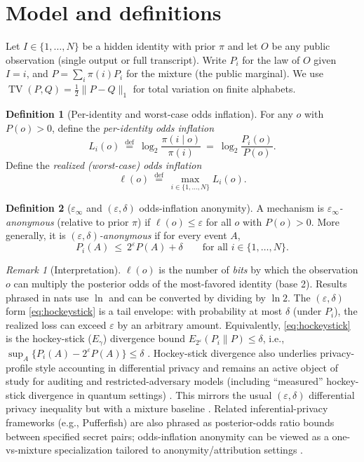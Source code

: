 \documentclass[11pt]{article}
\DeclareMathOperator{\TV}{TV}
\newcommand{\defeq}{\stackrel{\mathrm{def}}{=}}
\theoremstyle{definition}
\newtheorem{definition}{Definition}
\theoremstyle{remark}
\newtheorem{remark}{Remark}
\begin{document}
\section{Model and definitions}
Let $I\in\{1,\dots,N\}$ be a hidden identity with prior $\pi$ and let $O$ be any public observation (single output or full transcript).
Write $P_i$ for the law of $O$ given $I=i$, and $P=\sum_i \pi(i)P_i$ for the mixture (the public marginal).
We use $\TV(P,Q)=\tfrac12\|P-Q\|_1$ for total variation on finite alphabets.

\begin{definition}[Per-identity and worst-case odds inflation]\label{def:odds_inflation}
For any $o$ with $P(o)>0$, define the \emph{per-identity odds inflation}
\[
L_i(o)\ \defeq\ \log_2\frac{\pi(i\mid o)}{\pi(i)}\ =\ \log_2\frac{P_i(o)}{P(o)}.
\]
Define the \emph{realized (worst-case) odds inflation}
\[
\ell(o)\ \defeq\ \max_{i\in\{1,\dots,N\}} L_i(o).
\]
\end{definition}

\begin{definition}[$\varepsilon_\infty$ and $(\varepsilon,\delta)$ odds-inflation anonymity]\label{def:epsinf}
A mechanism is \emph{$\varepsilon_\infty$-anonymous} (relative to prior $\pi$) if $\ell(o)\le \varepsilon$ for all $o$ with $P(o)>0$.
More generally, it is \emph{$(\varepsilon,\delta)$-anonymous} if for every event $A$,
\begin{equation}\label{eq:hockeystick}
P_i(A)\ \le\ 2^\varepsilon P(A) + \delta
\qquad\text{for all } i\in\{1,\dots,N\}.
\end{equation}
\end{definition}

\begin{remark}[Interpretation]
$\ell(o)$ is the number of \emph{bits} by which the observation $o$ can multiply the posterior odds of the most-favored identity (base 2). Results phrased in nats use $\ln$ and can be converted by dividing by $\ln 2$.
The $(\varepsilon,\delta)$ form \eqref{eq:hockeystick} is a tail envelope: with probability at most $\delta$ (under $P_i$), the realized loss can exceed $\varepsilon$ by an arbitrary amount.
Equivalently, \eqref{eq:hockeystick} is the hockey-stick (\emph{$E_\gamma$}) divergence bound $E_{2^\varepsilon}(P_i\|P)\le\delta$, i.e., $\sup_A\{P_i(A)-2^\varepsilon P(A)\}\le\delta$ \cite{LiuCuffVerdu2017}.
Hockey-stick divergence also underlies privacy-profile style accounting in differential privacy and remains an active object of study for auditing and restricted-adversary models (including ``measured'' hockey-stick divergence in quantum settings) \cite{NuradhaMeasuredHockeyStick2025}.
This mirrors the usual $(\varepsilon,\delta)$ differential privacy inequality but with a mixture baseline \cite{DworkRoth2014}.
Related inferential-privacy frameworks (e.g., Pufferfish) are also phrased as posterior-odds ratio bounds between specified secret pairs; odds-inflation anonymity can be viewed as a one-vs-mixture specialization tailored to anonymity/attribution settings \cite{KiferMachanavajjhala2014Pufferfish}.
\end{remark}
\end{document}
